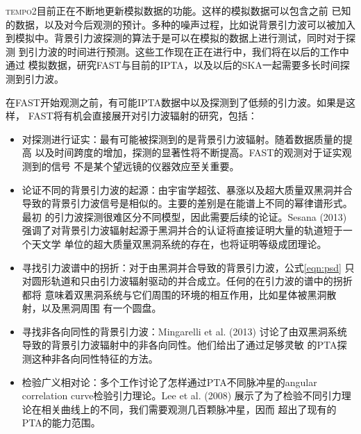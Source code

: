 \textsc{tempo2}目前正在不断地更新模拟数据的功能。这样的模拟数据可以包含之前
已知的数据，以及对今后观测的预计。多种的噪声过程，比如说背景引力波可以被加入
到模拟中。背景引力波探测的算法于是可以在模拟的数据上进行测试，同时对于探测
到引力波的时间进行预测。这些工作现在正在进行中，我们将在以后的工作中通过
模拟数据，研究FAST与目前的IPTA，以及以后的SKA一起需要多长时间探测到引力波。

在FAST开始观测之前，有可能IPTA数据中以及探测到了低频的引力波。如果是这样，
FAST将有机会直接展开对引力波辐射的研究，包括：
\begin{itemize}
\item 对探测进行证实：最有可能被探测到的是背景引力波辐射。随着数据质量的提高
以及时间跨度的增加，探测的显著性将不断提高。FAST的观测对于证实观测到的信号
不是某个望远镜的仪器效应至关重要。
\item 论证不同的背景引力波的起源：由宇宙学超弦、暴涨以及超大质量双黑洞并合
导致的背景引力波信号是相似的。主要的差别是在能谱上不同的幂律谱形式。最初
的引力波探测很难区分不同模型，因此需要后续的论证。Sesana (2013)\supercite{ses13}
强调了对背景引力波辐射起源于黑洞并合的认证将直接证明大量的轨道短于一个天文学
单位的超大质量双黑洞系统的存在，也将证明等级成团理论。
\item 寻找引力波谱中的拐折：对于由黑洞并合导致的背景引力波，公式\ref{eqn:psd}
只对圆形轨道和只由引力波辐射驱动的并合成立。任何的在引力波的谱中的拐折都将
意味着双黑洞系统与它们周围的环境的相互作用，比如星体被黑洞散射，以及黑洞周围
有一个圆盘\supercite{rws+14}。
\item 寻找非各向同性的背景引力波：Mingarelli et al. (2013)\supercite{msmv13}
讨论了由双黑洞系统导致的背景引力波辐射中的非各向同性。他们给出了通过足够灵敏
的PTA探测这种非各向同性特征的方法。
\item 检验广义相对论：多个工作讨论了怎样通过PTA不同脉冲星的angular correlation
curve检验引力理论\supercite{lee13,ljp+08,ljp+10}。Lee et al. (2008)\supercite{ljp+08}
展示了为了检验不同引力理论在相关曲线上的不同，我们需要观测几百颗脉冲星，因而
超出了现有的PTA的能力范围。
\end{itemize}


